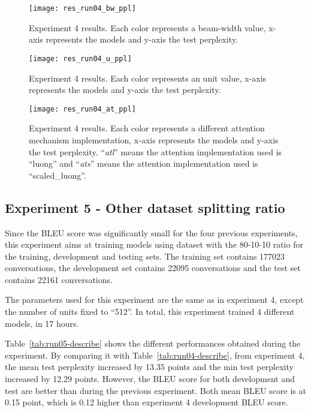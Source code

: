 \begin{landscape}
\begin{figure}
    \centering
    \texttt{[image: res\_run04\_bw\_ppl]}
    \decoRule
    \caption[Results experiment 4 BW-PPL]{Experiment 4 results. Each color represents a beam-width value, x-axis represents the models and y-axis the test perplexity.}
    \label{fig:res_run04_bw_ppl}
\end{figure}
\begin{figure}
    \centering
    \texttt{[image: res\_run04\_u\_ppl]}
    \decoRule
    \caption[Results experiment 4 U-PPL]{Experiment 4 results. Each color represents an unit value, x-axis represents the models and y-axis the test perplexity.}
    \label{fig:res_run04_u_ppl}
\end{figure}
\begin{figure}
    \centering
    \texttt{[image: res\_run04\_at\_ppl]}
    \decoRule
    \caption[Results experiment 4 AT-PPL]{Experiment 4 results. Each color represents a different attention mechanism implementation, x-axis represents the models and y-axis the test perplexity. ``\textit{atl}'' means the attention implementation used is ``luong'' and ``\textit{ats}'' means the attention implementation used is ``scaled\_luong''.}
    \label{fig:res_run04_at_ppl}
\end{figure}
\end{landscape}

\subsection{Experiment 5 - Other dataset splitting ratio}
Since the BLEU score was significantly small for the four previous experiments, this experiment aims at training models using dataset with the 80-10-10 ratio for the training, development and testing sets. The training set contains \num{177023} conversations, the development set contains \num{22095} conversations and the test set contains \num{22161} conversations.

The parameters used for this experiment are the same as in experiment 4, except the number of units fixed to ``512''. In total, this experiment trained 4 different models, in 17 hours.

Table~\ref{tab:run05-describe} shows the different performances obtained during the experiment. By comparing it with Table~\ref{tab:run04-describe}, from experiment 4, the mean test perplexity increased by \num{13.35} points and the min test perplexity increased by \num{12.29} points. However, the BLEU score for both development and test are better than during the previous experiment. Both mean BLEU score is at \num{0.15} point, which is \num{0.12} higher than experiment 4 development BLEU score.

